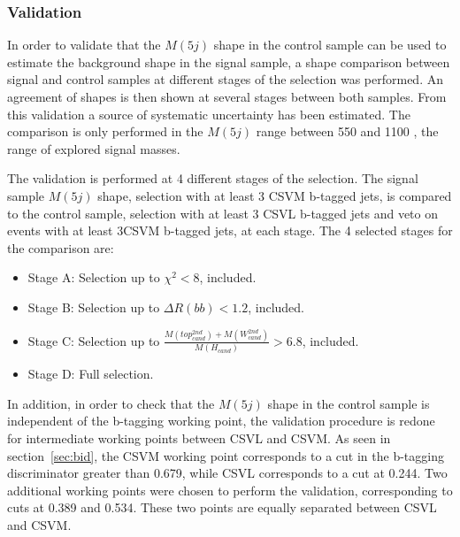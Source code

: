 \subsubsection{Validation}
\label{sec:validation}

In order to validate that the $M(5j)$ shape in the control sample can be used to estimate the background shape in the signal sample, a shape comparison between signal and control samples at different stages of the selection was performed. An agreement of shapes is then shown at several stages between both samples. From this validation a source of systematic uncertainty has been estimated. The comparison is only performed in the $M(5j)$ range between 550 and 1100 \GeVcc, the range of explored signal masses.

The validation is performed at 4 different stages of the selection. The signal sample $M(5j)$ shape, selection with at least 3 CSVM b-tagged jets, is compared to the control sample, selection with at least 3 CSVL b-tagged jets and veto on events with at least 3CSVM b-tagged jets, at each stage. The 4 selected stages for the comparison are:
\begin{itemize}
\item Stage A: Selection up to $\chi^{2}<8$, included.
\item Stage B: Selection up to $\Delta R(bb) <1.2$, included.
\item Stage C: Selection up to $\frac{M(top^{2nd}_{cand})+M(W^{2nd}_{cand})}{M(H_{cand})}>6.8$, included.
\item Stage D: Full selection.
\end{itemize}

In addition, in order to check that the $M(5j)$ shape in the control sample is independent of the b-tagging working point, the validation procedure is redone for intermediate working points between CSVL and CSVM. As seen in section~\ref{sec:bid}, the CSVM working point corresponds to a cut in the b-tagging discriminator greater than 0.679, while CSVL corresponds to a cut at 0.244. Two additional working points were chosen to perform the validation, corresponding to cuts at 0.389 and 0.534. These two points are equally separated between CSVL and CSVM. %

